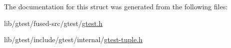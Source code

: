 The documentation for this struct was generated from the following files\-:\begin{DoxyCompactItemize}
\item 
lib/gtest/fused-\/src/gtest/\hyperlink{fused-src_2gtest_2gtest_8h}{gtest.\-h}\item 
lib/gtest/include/gtest/internal/\hyperlink{gtest-tuple_8h}{gtest-\/tuple.\-h}\end{DoxyCompactItemize}
